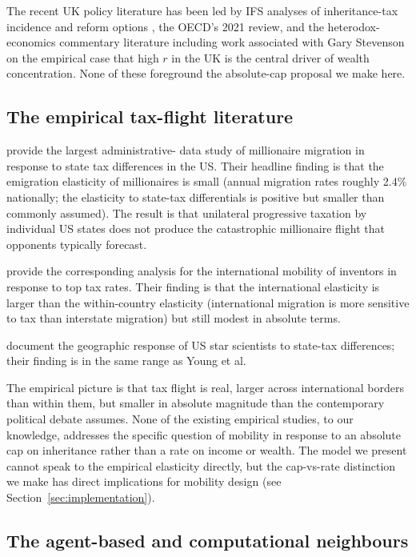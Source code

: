 \documentclass[11pt]{article}
\begin{document}
The recent UK policy literature has been led by IFS analyses of
inheritance-tax incidence and reform options
\citep[approximate citation;][]{ifs2023inheritance}, the OECD's
2021 review, and the heterodox-economics commentary literature
including work associated with Gary Stevenson on the empirical case
that high $r$ in the UK is the central driver of wealth
concentration.  None of these foreground the absolute-cap proposal
we make here.

\subsection{The empirical tax-flight literature}

\citet{young2016millionaire} provide the largest administrative-
data study of millionaire migration in response to state tax
differences in the US.  Their headline finding is that the
emigration elasticity of millionaires is small (annual migration
rates roughly 2.4\% nationally; the elasticity to state-tax
differentials is positive but smaller than commonly assumed).  The
result is that unilateral progressive taxation by individual US
states does not produce the catastrophic millionaire flight that
opponents typically forecast.

\citet{akcigit2016inventors} provide the corresponding analysis for
the international mobility of inventors in response to top tax rates.
Their finding is that the international elasticity is larger than
the within-country elasticity (international migration is more
sensitive to tax than interstate migration) but still modest in
absolute terms.

\citet{moretti2017taxing} document the geographic response of US
star scientists to state-tax differences; their finding is in the
same range as Young et al.\

The empirical picture is that tax flight is real, larger across
international borders than within them, but smaller in absolute
magnitude than the contemporary political debate assumes.  None of
the existing empirical studies, to our knowledge, addresses the
specific question of mobility in response to an absolute cap on
inheritance rather than a rate on income or wealth.  The model we
present cannot speak to the empirical elasticity directly, but the
cap-vs-rate distinction we make has direct implications for
mobility design (see Section~\ref{sec:implementation}).

\subsection{The agent-based and computational neighbours}
\end{document}
